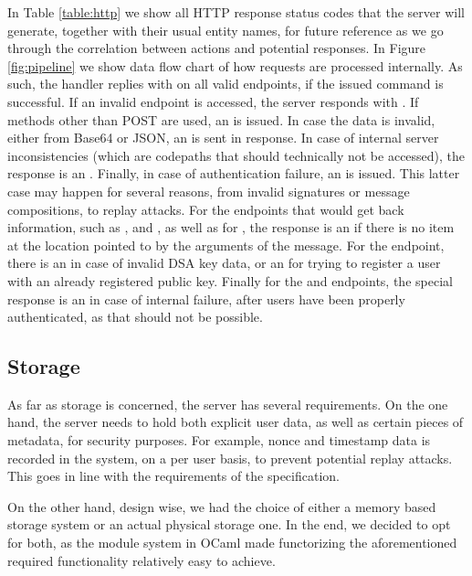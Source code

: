 In Table \ref{table:http} we show all HTTP response status codes that the server will generate, together with their usual entity names, for future reference as we go through the correlation between actions and potential responses.
In Figure \ref{fig:pipeline} we show data flow chart of how requests are processed internally.
As such, the handler replies with  on all valid endpoints, if the issued command is successful.
If an invalid endpoint is accessed, the server responds with .
If methods other than POST are used, an  is issued.
In case the data is invalid, either from Base64 or JSON, an  is sent in response.
In case of internal server inconsistencies (which are codepaths that should technically not be accessed), the response is an .
Finally, in case of authentication failure, an  is issued.
This latter case may happen for several reasons, from invalid signatures or message compositions, to replay attacks.
For the endpoints that would get back information, such as ,  and , as well as for , the response is an  if there is no item at the location pointed to by the arguments of the message.
For the  endpoint, there is an  in case of invalid DSA key data, or an  for trying to register a user with an already registered public key.
Finally for the  and  endpoints, the special response is an  in case of internal failure, after users have been properly authenticated, as that should not be possible.


\subsection{Storage}
As far as storage is concerned, the server has several requirements.
On the one hand, the server needs to hold both explicit user data, as well as certain pieces of metadata, for security purposes.
For example, nonce and timestamp data is recorded in the system, on a per user basis, to prevent potential replay attacks.
This goes in line with the requirements of the specification.

On the other hand, design wise, we had the choice of either a memory based storage system or an actual physical storage one.
In the end, we decided to opt for both, as the module system in OCaml made functorizing the aforementioned required functionality relatively easy to achieve.

